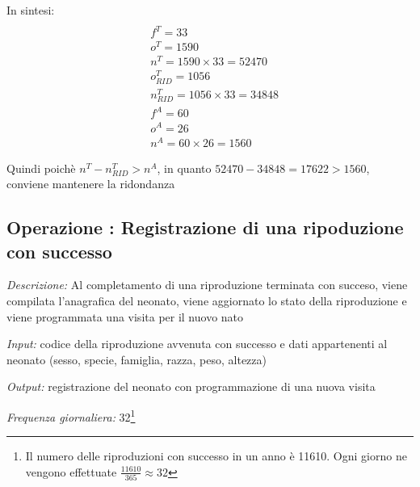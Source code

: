 \documentclass[12pt,a4paper]{article}
\begin{document}
In sintesi:
\begin{align*}
\\ 
&f^T=33
\\ 
&o^T = 1590
\\ 
&n^T = 1590\times33= 52470
\\
&o^T_{RID}= 1056
\\
&n^T_{RID} = 1056\times 33 = 34848
\\
&f^A= 60
\\
&o^A= 26
\\
&n^A = 60\times 26 = 1560
\end{align*}



\vspace{7pt}Quindi poichè $n^T - n^T_{RID} > n^A$, in quanto $52470 - 34848 = 17622 > 1560$, conviene mantenere la ridondanza


\subsection*{Operazione \thecounterAccessi{}: Registrazione di una ripoduzione con successo}
\noindent\textit{Descrizione:} Al completamento di una riproduzione terminata con succeso, viene compilata l'anagrafica del neonato, viene aggiornato lo stato della riproduzione e viene programmata una visita per il nuovo nato

\noindent\textit{Input:} codice della riproduzione avvenuta con successo e dati appartenenti al neonato (sesso, specie, famiglia, razza, peso, altezza)

\noindent\textit{Output:} registrazione del neonato con programmazione di una nuova visita

\noindent\textit{Frequenza giornaliera:} 32\footnote{Il numero delle riproduzioni con successo in un anno è 11610. Ogni giorno ne vengono effettuate $\frac{11610}{365}\approx 32$}
\end{document}
